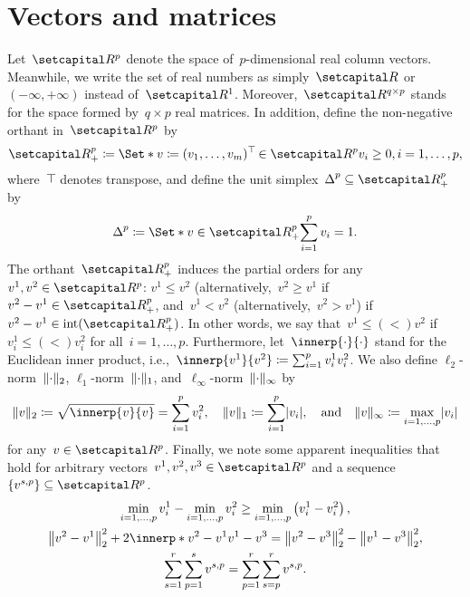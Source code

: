 \documentclass[../main]{subfiles}
\begin{document}
\section{Vectors and matrices}
Let~$\setR^p$ denote the space of~$p$-dimensional real column vectors.
Meanwhile, we write the set of real numbers as simply~$\setR$ or~$(- \infty, + \infty)$ instead of~$\setR^1$.
Moreover,~$\setR^{q \times p}$ stands for the space formed by~$q \times p$ real matrices.
In addition, define the non-negative orthant in~$\setR^p$ by
\begin{equation}
    \setRpos^p \coloneqq \Set*{v \coloneqq (v_1, \dots, v_m)^\T \in \setR^p}{v_i \ge 0, i = 1, \dots, p}
,\end{equation} 
where~$\top\hspace{-1pt}$ denotes transpose, and define the unit simplex~$\simplex^p \subseteq \setRpos^p$ by
\begin{equation} \label{eq:simplex}
    \simplex^p \coloneqq \Set*{v \in \setRpos^p}{\sum_{i = 1}^{p} v_i = 1}
.\end{equation} 
The orthant~$\setRpos^p$ induces the partial orders for any~$v^1, v^2 \in \setR^p$: $v^1 \le v^2$ (alternatively,~$v^2 \ge v^1$ if~$v^2 - v^1 \in \setRpos^p$, and~$v^1 < v^2$ (alternatively,~$v^2 > v^1$) if~$v^2 - v^1 \in \interior(\setRpos^p)$.
In other words, we say that~$v^1 \mathrel{\le (<)} v^2$ if~$v^1_i \mathrel{\le (<)} v^2_i$ for all~$i = 1, \dots, p$.
Furthermore, let~$\innerp{\cdot}{\cdot}$ stand for the Euclidean inner product, i.e.,~$\innerp{v^1}{v^2} \coloneqq \sum_{i = 1}^{p} v^1_i v^2_i$.
We also define $\ell_2$-norm~$\lVert\cdot\rVert_2$, $\ell_1$-norm~$\lVert\cdot\rVert_1$, and~$\ell_\infty$-norm~$\lVert\cdot\rVert_\infty$ by
\begin{equation}
    \norm{v}_2 \coloneqq \sqrt{\innerp{v}{v}} = \sum_{i = 1}^{p} v_i^2, \quad \norm{v}_1 \coloneqq \sum_{i = 1}^{p} \abs{v_i}, \eqand \norm{v}_\infty \coloneqq \max_{i = 1, \dots, p} \abs{v_i}
\end{equation} 
for any~$v \in \setR^p$.
Finally, we note some apparent inequalities that hold for arbitrary vectors~$v^1, v^2, v^3 \in \setR^p$ and a sequence~$\set{v^{s,p}} \subseteq \setR^p$.
\begin{gather} 
    \min_{i = 1, \dots, p} v^1_i - \min_{i = 1, \dots, p} v^2_i \ge \min_{i = 1, \dots, p} \left( v^1_i - v^2_i \right) \label{eq:min_diff_ineq}, \\
    \norm*{v^2 - v^1}_2^2 + 2 \innerp*{v^2 - v^1}{v^1 - v^3} = \norm*{ v^2 - v^3 }_2^2 - \norm*{v^1 - v^3}_2^2 \label{eq:Pythagoras}, \\
    \sum_{s=1}^r \sum_{p=1}^s v^{s,p} = \sum_{p=1}^r \sum_{s=p}^r v^{s,p} \label{eq:change sum}
.\end{gather}
\end{document}
